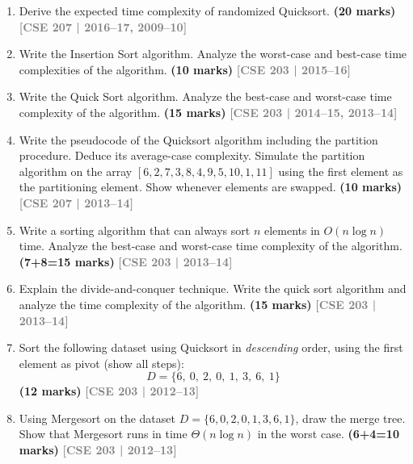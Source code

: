 \documentclass[12pt,a3paper]{article}
\newcommand{\yr}[1]{\hfill\textcolor{gray}{\small\textbf{[#1]}}}
\newcommand{\mk}[1]{\textcolor{orange!70!black}{\small\textbf{(#1 marks)}}}
\begin{document}
\begin{enumerate}
\item Derive the expected time complexity of randomized Quicksort. \mk{20}
\yr{CSE 207 | 2016--17, 2009--10}

\item Write the Insertion Sort algorithm. Analyze the worst-case and best-case time complexities of the algorithm. \mk{10}
\yr{CSE 203 | 2015--16}

\item Write the Quick Sort algorithm. Analyze the best-case and worst-case time complexity of the algorithm. \mk{15}
\yr{CSE 203 | 2014--15, 2013--14}

\item Write the pseudocode of the Quicksort algorithm including the partition procedure. Deduce its average-case complexity. Simulate the partition algorithm on the array $[6, 2, 7, 3, 8, 4, 9, 5, 10, 1, 11]$ using the first element as the partitioning element. Show whenever elements are swapped. \mk{10}
\yr{CSE 207 | 2013--14}

\item Write a sorting algorithm that can always sort $n$ elements in $O(n \log n)$ time. Analyze the best-case and worst-case time complexity of the algorithm. \mk{7+8=15}
\yr{CSE 203 | 2013--14}

\item Explain the divide-and-conquer technique. Write the quick sort algorithm and analyze the time complexity of the algorithm. \mk{15}
\yr{CSE 203 | 2013--14}

\item Sort the following dataset using Quicksort in \textit{descending} order, using the first element as pivot (show all steps):
\[ D = \{6,\ 0,\ 2,\ 0,\ 1,\ 3,\ 6,\ 1\} \]
\mk{12}
\yr{CSE 203 | 2012--13}

\item Using Mergesort on the dataset $D = \{6, 0, 2, 0, 1, 3, 6, 1\}$, draw the merge tree. Show that Mergesort runs in time $\Theta(n \log n)$ in the worst case. \mk{6+4=10}
\yr{CSE 203 | 2012--13}


\end{enumerate}
\end{document}
